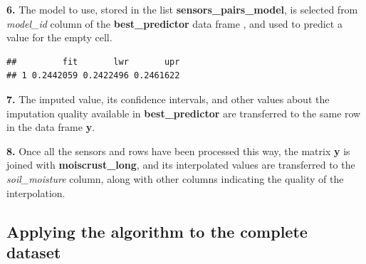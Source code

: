 \documentclass[]{article}
\newenvironment{Shaded}{\begin{snugshade}}{\end{snugshade}}
\newcommand{\DataTypeTok}[1]{\textcolor[rgb]{0.13,0.29,0.53}{#1}}
\newcommand{\KeywordTok}[1]{\textcolor[rgb]{0.13,0.29,0.53}{\textbf{#1}}}
\newcommand{\NormalTok}[1]{#1}
\newcommand{\OperatorTok}[1]{\textcolor[rgb]{0.81,0.36,0.00}{\textbf{#1}}}
\newcommand{\OtherTok}[1]{\textcolor[rgb]{0.56,0.35,0.01}{#1}}
\newcommand{\StringTok}[1]{\textcolor[rgb]{0.31,0.60,0.02}{#1}}
\begin{document}
\begin{table}[H]
\centering
{}
\end{table}

\textbf{6.} The model to use, stored in the list
\textbf{sensors\_pairs\_model}, is selected from \emph{model\_id} column
of the \textbf{best\_predictor} data frame , and used to predict a value
for the empty cell.

\begin{Shaded}
\end{Shaded}

\begin{verbatim}
##         fit       lwr       upr
## 1 0.2442059 0.2422496 0.2461622
\end{verbatim}

\textbf{7.} The imputed value, its confidence intervals, and other
values about the imputation quality available in
\textbf{best\_predictor} are transferred to the same row in the data
frame \textbf{y}.

\textbf{8.} Once all the sensors and rows have been processed this way,
the matrix \textbf{y} is joined with \textbf{moiscrust\_long}, and its
interpolated values are transferred to the \emph{soil\_moisture} column,
along with other columns indicating the quality of the interpolation.

\hypertarget{applying-the-algorithm-to-the-complete-dataset}{%
\subsection{Applying the algorithm to the complete
dataset}\label{applying-the-algorithm-to-the-complete-dataset}}
\end{document}
